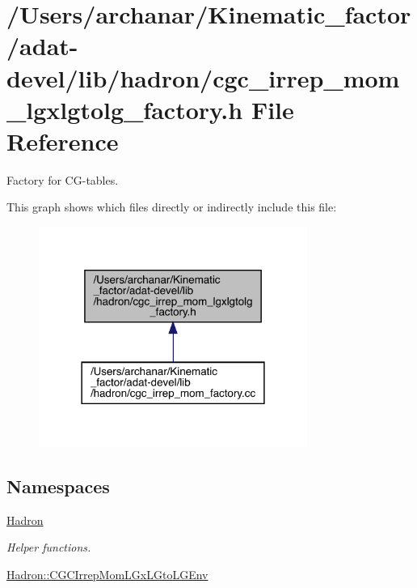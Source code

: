 \hypertarget{adat-devel_2lib_2hadron_2cgc__irrep__mom__lgxlgtolg__factory_8h}{}\section{/\+Users/archanar/\+Kinematic\+\_\+factor/adat-\/devel/lib/hadron/cgc\+\_\+irrep\+\_\+mom\+\_\+lgxlgtolg\+\_\+factory.h File Reference}
\label{adat-devel_2lib_2hadron_2cgc__irrep__mom__lgxlgtolg__factory_8h}


Factory for C\+G-\/tables.  


This graph shows which files directly or indirectly include this file\+:
\nopagebreak
\begin{figure}[H]
\begin{center}
\leavevmode
\includegraphics[width=249pt]{d7/d57/adat-devel_2lib_2hadron_2cgc__irrep__mom__lgxlgtolg__factory_8h__dep__incl}
\end{center}
\end{figure}
\subsection*{Namespaces}
\begin{DoxyCompactItemize}
\item 
 \mbox{\hyperlink{namespaceHadron}{Hadron}}
\begin{DoxyCompactList}\small\item\em Helper functions. \end{DoxyCompactList}\item 
 \mbox{\hyperlink{namespaceHadron_1_1CGCIrrepMomLGxLGtoLGEnv}{Hadron\+::\+C\+G\+C\+Irrep\+Mom\+L\+Gx\+L\+Gto\+L\+G\+Env}}
\end{DoxyCompactItemize}
